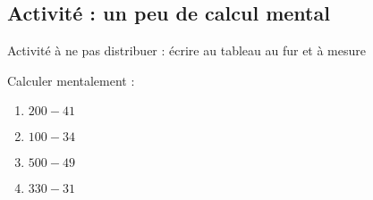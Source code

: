 
\subsection*{Activité : un peu de calcul mental}
Activité à ne pas distribuer : écrire au tableau au fur et à mesure

Calculer mentalement :
\begin{enumerate}
    \item
        \( 200-41\)
    \item
        \( 100-34\)
    \item
        \( 500-49\)
    \item
        \( 330-31\)
\end{enumerate}
